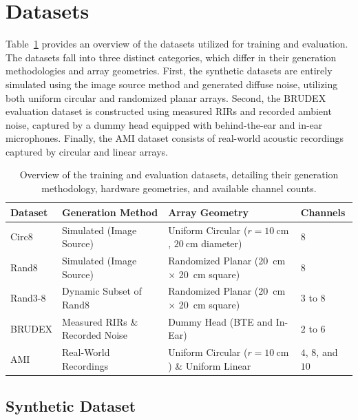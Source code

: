 \documentclass[lettersize,journal]{IEEEtran}
\begin{document}
\section{Datasets}
\label{sec:datasets}

Table~\ref{tab:datasets_overview} provides an overview of the datasets utilized for training and evaluation.
The datasets fall into three distinct categories, which differ in their generation methodologies and array geometries.
First, the synthetic datasets are entirely simulated using the image source method and generated diffuse noise,
utilizing both uniform circular and randomized planar arrays.
Second, the \gls{BRUDEX} evaluation dataset is constructed using measured \glspl{RIR} and recorded ambient noise,
captured by a dummy head equipped with behind-the-ear and in-ear microphones.
Finally, the \gls{AMI} dataset consists of real-world acoustic recordings captured by circular and linear arrays.

\begin{table}[hbtp]
  \centering
  \caption{Overview of the training and evaluation datasets, detailing their generation methodology, hardware geometries, and available channel counts.}
  \label{tab:datasets_overview}
  \begin{tabular}{llll}
    \hline
    \textbf{Dataset} & \textbf{Generation Method} & \textbf{Array Geometry} & \textbf{Channels} \\
    \hline
    Circ8 & Simulated (Image Source) & Uniform Circular ($r = \SI{10}{\centi\meter}$, $\SI{20}{\centi\meter}$ diameter) & $8$ \\
    Rand8 & Simulated (Image Source) & Randomized Planar (\SI{20}{\centi\meter} $\times$ \SI{20}{\centi\meter} square) & $8$ \\
    Rand3-8 & Dynamic Subset of Rand8 & Randomized Planar (\SI{20}{\centi\meter} $\times$ \SI{20}{\centi\meter} square) & $3$ to $8$ \\
    \gls{BRUDEX} & Measured RIRs \& Recorded Noise & Dummy Head (BTE and In-Ear) & $2$ to $6$ \\
    \gls{AMI} & Real-World Recordings & Uniform Circular ($r = \SI{10}{\centi\meter}$) \& Uniform Linear & $4$, $8$, and $10$ \\
    \hline
  \end{tabular}
\end{table}

\subsection{Synthetic Dataset}
\end{document}
